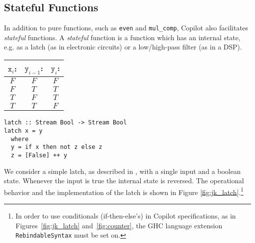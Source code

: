 \subsection{Stateful Functions} \label{sec:stateful}

In addition to pure functions, such as {\tt even} and {\tt mul\_comp},
Copilot also facilitates \emph{stateful} functions. A \emph{stateful} function
is a function which has an internal state, e.g. as a latch (as in electronic
circuits) or a low/high-pass filter (as in a DSP).

\begin{figure*}
\begin{minipage}{0.4\linewidth}
\begin{tabular}{c|c||c}
$\mathtt{x}_i$: & $\mathtt{y}_{i-1}$: & $\mathtt{y}_i$:\\
\hline
$F$ & $F$ & $F$ \\
\hline
$F$ & $T$ & $T$ \\
\hline
$T$ & $F$ & $T$ \\
\hline
$T$ & $T$ & $F$
\end{tabular}
\end{minipage}
\hspace{1cm}
\begin{minipage}{0.6\linewidth}
\begin{lstlisting}[frame=none]
latch :: Stream Bool -> Stream Bool
latch x = y
  where
  y = if x then not z else z
  z = [False] ++ y
\end{lstlisting}
\end{minipage}
\caption{A latch. The specification is provided at the left and the
implementation is provided at the right.}
\label{fig:jk_latch}
\end{figure*}

\begin{example}
We consider a simple latch, as described in \cite{Farhat2004}, with a single
input and a boolean state. Whenever the input is true the internal state is reversed.
The operational behavior and the implementation of the latch is shown in Figure
\ref{fig:jk_latch}.\footnote
{In order
to use conditionals (if-then-else's) in Copilot specifications,
as in Figures~\ref{fig:jk_latch} and~\ref{fig:counter}, the GHC
language extension {\tt RebindableSyntax} must be set on.}
\end{example}

